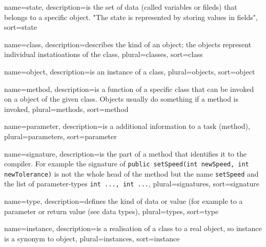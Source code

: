 {
	name=state,
	description={is the set of data (called variables or fileds) that
		belongs to a specific object. "The state is represented by
		storing values in fields"},
	sort=state
}


{
	name=class,
	description={describes the kind of an object; the objects represent
		individual instatioations of the class},
	plural=classes,
	sort=class
}

{
	name=object,
	description={is an instance of a class},
	plural=objects,
	sort=object
}

{
	name=method,
	description={is a function of a specific class that can be invoked on
		a object of the given class. Objects usually do something if a
		method is invoked},
	plural=methods,
	sort=method
}

{
	name=parameter,
	description={is a additional information to a task (method)},
	plural=parameters,
	sort=parameter
}

{
	name=signature,
	description={is the part of a method that identifies it to the 
		compiler. For example the signature of 
		\lstinline{public setSpeed(int newSpeed, int newTolerance)}
		is not the whole head of the method but the name 
		\lstinline{setSpeed} and the list of parameter-types 
		\lstinline{int ..., int ...}},
	plural=signatures,
	sort=signature
}

{
	name=type,
	description={defines the kind of data or value (for example to a
		parameter or return value (see data types)},
	plural=types,
	sort=type
}

{
	name=instance,
	description={is a realisation of a class to a real object, so instance
		is a synonym to object},
	plural=instances,
	sort=instance
}
